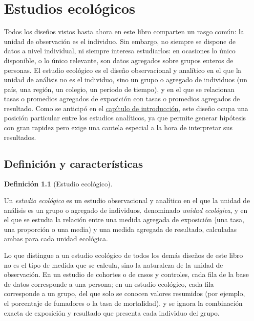 \documentclass[
  spanish,
  a4paper,
]{scrreport}
\theoremstyle{definition}
\theoremstyle{definition}
\newtheorem{definition}{Definición}[chapter]
\theoremstyle{remark}
\begin{document}
\chapter{Estudios ecológicos}\label{estudios-ecoluxf3gicos}

Todos los diseños vistos hasta ahora en este libro comparten un rasgo
común: la unidad de observación es el individuo. Sin embargo, no siempre
se dispone de datos a nivel individual, ni siempre interesa estudiarlos:
en ocasiones lo único disponible, o lo único relevante, son datos
agregados sobre grupos enteros de personas. El estudio ecológico es el
diseño observacional y analítico en el que la unidad de análisis no es
el individuo, sino un grupo o agregado de individuos (un país, una
región, un colegio, un periodo de tiempo), y en el que se relacionan
tasas o promedios agregados de exposición con tasas o promedios
agregados de resultado. Como se anticipó en el
\hyperref[introducciuxf3n-a-los-tipos-de-estudios-estaduxedsticos]{capítulo
de introducción}, este diseño ocupa una posición particular entre los
estudios analíticos, ya que permite generar hipótesis con gran rapidez
pero exige una cautela especial a la hora de interpretar sus resultados.

\section{Definición y
características}\label{definiciuxf3n-y-caracteruxedsticas-4}

\begin{definition}[Estudio
ecológico]\protect\hypertarget{def-ecologicos-estudio-ecologico}{}\label{def-ecologicos-estudio-ecologico}

Un \emph{estudio ecológico} es un estudio observacional y analítico en
el que la unidad de análisis es un grupo o agregado de individuos,
denominado \emph{unidad ecológica}, y en el que se estudia la relación
entre una medida agregada de exposición (una tasa, una proporción o una
media) y una medida agregada de resultado, calculadas ambas para cada
unidad ecológica.

\end{definition}

Lo que distingue a un estudio ecológico de todos los demás diseños de
este libro no es el tipo de medida que se calcula, sino la naturaleza de
la unidad de observación. En un estudio de cohortes o de casos y
controles, cada fila de la base de datos corresponde a una persona; en
un estudio ecológico, cada fila corresponde a un grupo, del que solo se
conocen valores resumidos (por ejemplo, el porcentaje de fumadores o la
tasa de mortalidad), y se ignora la combinación exacta de exposición y
resultado que presenta cada individuo del grupo.
\end{document}

